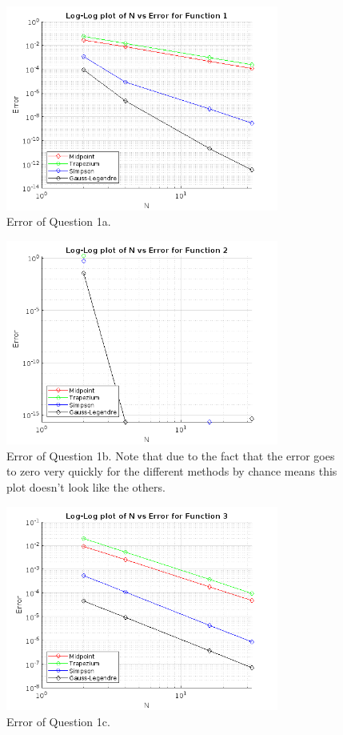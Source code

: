 \documentclass[letterpaper, reqno,11pt]{article}
\begin{document}
\begin{figure}[htpb]
    \centering
    \includegraphics[width=0.8\textwidth]{q1a}
    \caption{Error of Question 1a.}
    \label{fig:q1a}
\end{figure}
\begin{figure}[htpb]
    \centering
    \includegraphics[width=0.8\textwidth]{q1b}
    \caption{Error of Question 1b. Note that due to the fact that the error goes to zero very quickly for the different methods by chance means this plot doesn't look like the others.}
    \label{fig:q1b}
\end{figure}
\begin{figure}[htpb]
    \centering
    \includegraphics[width=0.8\textwidth]{q1c}
    \caption{Error of Question 1c.}
    \label{fig:q1c}
\end{figure}
\end{document}
